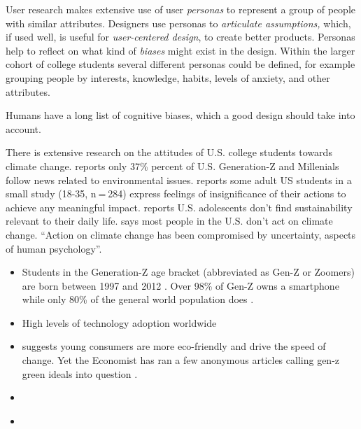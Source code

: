\documentclass[
  letterpaper,
  DIV=11,
  numbers=noendperiod]{scrartcl}
\begin{document}
User research makes extensive use of user \emph{personas} to represent a
group of people with similar attributes. Designers use personas to
\emph{articulate assumptions,} which, if used well, is useful for
\emph{user-centered design}, to create better products. Personas help to
reflect on what kind of \emph{biases} might exist in the design. Within
the larger cohort of college students several different personas could
be defined, for example grouping people by interests, knowledge, habits,
levels of anxiety, and other attributes.

Humans have a long list of cognitive biases, which a good design should
take into account.

There is extensive research on the attitudes of U.S. college students
towards climate change. \citep{americanpressinstituteKnowingNewsHow2022}
reports only 37\% percent of U.S. Generation-Z and Millenials follow
news related to environmental issues.
\citep{schwartzClimateChangeAnxiety2022} reports some adult US students
in a small study (18-35, n = 284) express feelings of insignificance of
their actions to achieve any meaningful impact.
\citep{thomaesGreenTeensUnderstanding2023} reports U.S. adolescents
don't find sustainability relevant to their daily life.
\citep{rossClimateChangeChallenge2016} says most people in the U.S.
don't act on climate change. ``Action on climate change has been
compromised by uncertainty, aspects of human psychology''.

\begin{itemize}
\item
  Students in the Generation-Z age bracket (abbreviated as Gen-Z or
  Zoomers) are born between 1997 and 2012
  \citep{brankavuletaGenerationStatistics2023}. Over 98\% of Gen-Z owns
  a smartphone while only 80\% of the general world population does
  \citep{globalwebindex98GenOwn2017, bankmycellHowManyPeople2022}.
\item
  High levels of technology adoption worldwide
\item
  \citep{creditsuisseYoungConsumersMay2022} suggests young consumers are
  more eco-friendly and drive the speed of change. Yet the Economist has
  ran a few anonymous articles calling gen-z green ideals into question
  \citep{theeconomistHowSellYoung2023, HowGenMillennials2023}.
\item
  \citet{deyangeorgiev39SmartphoneStatistics2023}
\item
  \citet{alexreiceMostEcoconsciousGeneration2021}
\end{itemize}
\end{document}
